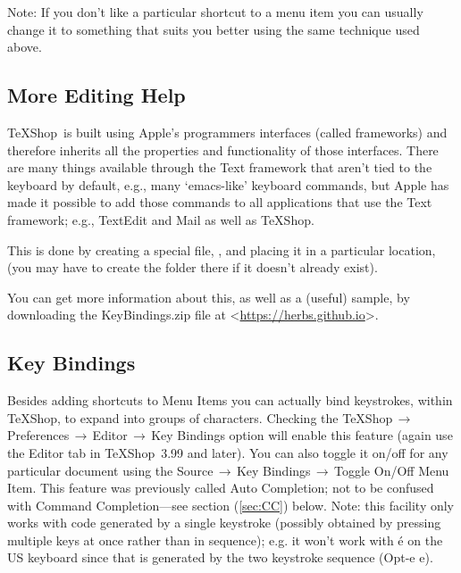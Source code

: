 \documentclass[letterpaper,11pt]{article}
\newcommand{\TS}{\textsf{\TeX Shop}}
\newcommand{\cmd}[1]{\textsf{#1}}
\newcommand{\mnu}[1]{\textsf{#1}}
\newcommand{\To}{\,\(\to\)\,}
\begin{document}
Note: If you don't like a particular shortcut to a menu item you can usually change it to something that suits you better using the same technique used above.

\subsection{More Editing Help}

\TS\ is built using Apple's programmers interfaces (called frameworks) and therefore inherits all the properties and functionality of those interfaces. There are many things available through the Text framework that aren't tied to the keyboard by default, e.g., many `\cmd{emacs}-like' keyboard commands, but Apple has made it possible to add those commands to all applications that use the Text framework; e.g., \textsf{TextEdit} and \textsf{Mail} as well as \TS.

This is done by creating a special file, , and placing it in a particular location,  (you may have to create the  folder there if it doesn't already exist).

You can get more information about this, as well as a (useful) sample, by downloading the \textsf{KeyBindings.zip} file at <\url{https://herbs.github.io}>.


\subsection{Key Bindings}

Besides adding shortcuts to Menu Items you can actually bind keystrokes, within \TS, to expand into groups of characters. Checking the \mnu{TeXShop}\To\mnu{Preferences}\To\mnu{Editor}\To\mnu{Key Bindings} option will enable this feature (again use the \cmd{Editor} tab in \TS\ 3.99 and later). You can also toggle it on/off for any particular document using the \mnu{Source}\To\mnu{Key Bindings}\To\mnu{Toggle On/Off} Menu Item. This feature was previously called Auto Completion; not to be confused with Command Completion---see section (\ref{sec:CC}) below. Note: this facility only works with code generated by a single keystroke (possibly obtained by pressing multiple keys at once rather than in sequence); e.g. it won't work with é on the US keyboard since that is generated by the two keystroke sequence (\cmd{Opt-e e}).
\end{document}
